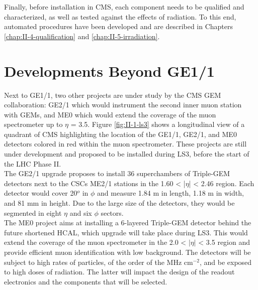     Finally, before installation in CMS, each component needs to be qualified and characterized, as well as tested against the effects of radiation. To this end, automated procedures have been developed and are described in Chapters \ref{chap:II-4-qualification} and \ref{chap:II-5-irradiation}.

  \section{Developments Beyond GE1/1}

    Next to GE1/1, two other projects are under study by the CMS GEM collaboration: GE2/1 which would instrument the second inner muon station with GEMs, and ME0 which would extend the coverage of the muon spectrometer up to $\eta$ = 3.5. Figure \ref{fig:II-1-ls3} shows a longitudinal view of a quadrant of CMS highlighting the location of the GE1/1, GE2/1, and ME0 detectors colored in red within the muon spectrometer. These projects are still under development and proposed to be installed during LS3, before the start of the LHC Phase II. \\

    The GE2/1 upgrade proposes to install 36 superchambers of Triple-GEM detectors next to the CSCs ME2/1 stations in the 1.60 < |$\eta$| < 2.46 region. Each detector would cover 20$^o$ in $\phi$ and measure 1.84 m in length, 1.18 m in width, and 81 mm in height. Due to the large size of the detectors, they would be segmented in eight $ \eta $ and six $ \phi $ sectors. \\

    The ME0 project aims at installing a 6-layered Triple-GEM detector behind the future shortened HCAL, which upgrade will take place during LS3. This would extend the coverage of the muon spectrometer in the 2.0 < $|\eta|$ < 3.5 region and provide efficient muon identification with low background. The detectors will be subject to high rates of particles, of the order of the MHz cm$^{-2}$, and be exposed to high doses of radiation. The latter will impact the design of the readout electronics and the components that will be selected.

